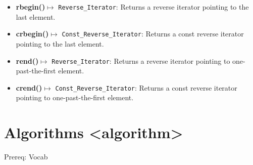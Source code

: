 \documentclass{report}
\begin{document}
\begin{itemize}
        \item \textbf{rbegin()}\(\mapsto\) \texttt{Reverse\_Iterator}: Returns a reverse iterator pointing to the last element.
        \item \textbf{crbegin()}\(\mapsto\) \texttt{Const\_Reverse\_Iterator}: Returns a const reverse iterator pointing to the last element.
        \item \textbf{rend()}\(\mapsto\) \texttt{Reverse\_Iterator}: Returns a reverse iterator pointing to one-past-the-first element.
        \item \textbf{crend()}\(\mapsto\) \texttt{Const\_Reverse\_Iterator}: Returns a const reverse iterator pointing to one-past-the-first element.
    \end{itemize}

    \pagebreak \bigbreak \noindent 
    \section{\LARGE Algorithms <algorithm> }
    \bigbreak \noindent 
    Prereq: Vocab
\end{document}
